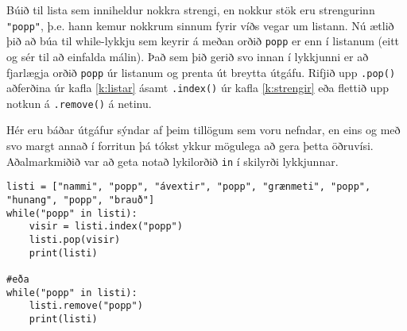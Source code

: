 \begin{exercise}\label{lyk8}
Búið til lista sem inniheldur nokkra strengi, en nokkur stök eru strengurinn \texttt{"popp"}, þ.e. hann kemur nokkrum sinnum fyrir víðs vegar um listann.
Nú ætlið þið að búa til while-lykkju sem keyrir á meðan orðið \texttt{popp} er enn í listanum (eitt og sér til að einfalda málin).
Það sem þið gerið svo innan í lykkjunni er að fjarlægja orðið \texttt{popp} úr listanum og prenta út breytta útgáfu.
Rifjið upp \texttt{.pop()} aðferðina úr kafla \ref{k:listar} ásamt \texttt{.index()} úr kafla \ref{k:strengir} eða flettið upp notkun á \texttt{.remove()} á netinu.
\end{exercise}
\begin{Answer}[ref={lyk8}]
Hér eru báðar útgáfur sýndar af þeim tillögum sem voru nefndar, en eins og með svo margt annað í forritun þá tókst ykkur mögulega að gera þetta öðruvísi.
Aðalmarkmiðið var að geta notað lykilorðið \texttt{in} í skilyrði lykkjunnar.
	\begin{lstlisting}
listi = ["nammi", "popp", "ávextir", "popp", "grænmeti", "popp", "hunang", "popp", "brauð"]
while("popp" in listi):
	visir = listi.index("popp")
	listi.pop(visir)
	print(listi)
		
#eða
while("popp" in listi):
	listi.remove("popp")
	print(listi)\end{lstlisting}
\end{Answer}